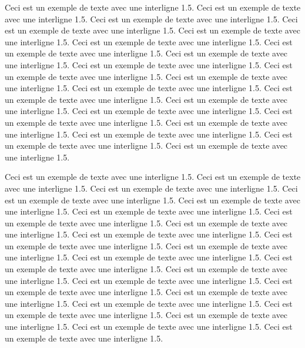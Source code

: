 \documentclass[12pt]{report}
\begin{document}
Ceci est un exemple de texte avec une interligne 1.5. 
Ceci est un exemple de texte avec une interligne 1.5. 
Ceci est un exemple de texte avec une interligne 1.5. 
Ceci est un exemple de texte avec une interligne 1.5. 
Ceci est un exemple de texte avec une interligne 1.5. 
Ceci est un exemple de texte avec une interligne 1.5. 
Ceci est un exemple de texte avec une interligne 1.5. 
Ceci est un exemple de texte avec une interligne 1.5. 
Ceci est un exemple de texte avec une interligne 1.5. 
Ceci est un exemple de texte avec une interligne 1.5. 
Ceci est un exemple de texte avec une interligne 1.5. 
Ceci est un exemple de texte avec une interligne 1.5. 
Ceci est un exemple de texte avec une interligne 1.5. 
Ceci est un exemple de texte avec une interligne 1.5. 
Ceci est un exemple de texte avec une interligne 1.5. 
Ceci est un exemple de texte avec une interligne 1.5. 
Ceci est un exemple de texte avec une interligne 1.5. 
Ceci est un exemple de texte avec une interligne 1.5. 
Ceci est un exemple de texte avec une interligne 1.5. 
Ceci est un exemple de texte avec une interligne 1.5. 

Ceci est un exemple de texte avec une interligne 1.5. 
Ceci est un exemple de texte avec une interligne 1.5. 
Ceci est un exemple de texte avec une interligne 1.5. 
Ceci est un exemple de texte avec une interligne 1.5. 
Ceci est un exemple de texte avec une interligne 1.5. 
Ceci est un exemple de texte avec une interligne 1.5. 
Ceci est un exemple de texte avec une interligne 1.5. 
Ceci est un exemple de texte avec une interligne 1.5. 
Ceci est un exemple de texte avec une interligne 1.5. 
Ceci est un exemple de texte avec une interligne 1.5. 
Ceci est un exemple de texte avec une interligne 1.5. 
Ceci est un exemple de texte avec une interligne 1.5. 
Ceci est un exemple de texte avec une interligne 1.5. 
Ceci est un exemple de texte avec une interligne 1.5. 
Ceci est un exemple de texte avec une interligne 1.5. 
Ceci est un exemple de texte avec une interligne 1.5. 
Ceci est un exemple de texte avec une interligne 1.5. 
Ceci est un exemple de texte avec une interligne 1.5. 
Ceci est un exemple de texte avec une interligne 1.5. 
Ceci est un exemple de texte avec une interligne 1.5. 
Ceci est un exemple de texte avec une interligne 1.5. 
Ceci est un exemple de texte avec une interligne 1.5. 

\doublespacing
\end{document}
